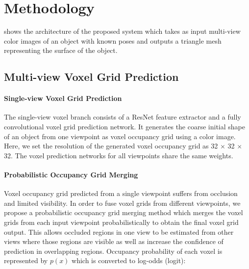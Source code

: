 \section{Methodology}

 shows the architecture of the proposed system which takes as input multi-view color images of an object with known poses and outputs a triangle mesh representing the surface of the object.

\subsection{Multi-view Voxel Grid Prediction}
\label{subsec:multiview_voxel}

\paragraph{Single-view Voxel Grid Prediction}
The single-view voxel branch consists of a ResNet feature extractor and a fully convolutional voxel grid prediction network. It generates the coarse initial shape of an object from one viewpoint as voxel occupancy grid using a color image. Here, we set the resolution of the generated voxel occupancy grid as 32 $\times$ 32 $\times$ 32. The voxel prediction networks for all viewpoints share the same weights.

\paragraph{Probabilistic Occupancy Grid Merging}
Voxel occupancy grid predicted from a single viewpoint suffers from occlusion and limited visibility. In order to fuse voxel grids from different viewpoints, we propose a probabilistic occupancy grid merging method which merges the voxel grids from each input viewpoint probabilistically to obtain the final voxel grid output. This allows occluded regions in one view to be estimated from other views where those regions are visible as well as increase the confidence of prediction in overlapping regions.
Occupancy probability of each voxel is represented by $p(x)$ which is converted to log-odds (logit):

